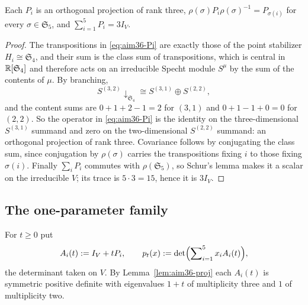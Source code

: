 \begin{lemma}\label{lem:aim36-proj}
Each $P_i$ is an orthogonal projection of rank three,
$\rho(\sigma)P_i\rho(\sigma)^{-1}=P_{\sigma(i)}$ for every
$\sigma\in\mathfrak S_5$, and $\sum_{i=1}^5P_i=3I_V$.
\end{lemma}
\begin{proof}
The transpositions in \eqref{eq:aim36-Pi} are exactly those of the point
stabilizer $H_i\cong\mathfrak S_4$, and their sum is the class sum of
transpositions, which is central in $\mathbb R[\mathfrak S_4]$ and therefore acts on an
irreducible Specht module $S^\mu$ by the sum of the contents of $\mu$.  By
branching,
\[
S^{(3,2)}\!\downarrow_{\mathfrak S_4}\cong S^{(3,1)}\oplus S^{(2,2)},
\]
and the content sums are $0+1+2-1=2$ for $(3,1)$ and $0+1-1+0=0$ for $(2,2)$.
So the operator in \eqref{eq:aim36-Pi} is the identity on the three-dimensional
$S^{(3,1)}$ summand and zero on the two-dimensional $S^{(2,2)}$ summand: an
orthogonal projection of rank three.  Covariance follows by conjugating the
class sum, since conjugation by $\rho(\sigma)$ carries the transpositions
fixing $i$ to those fixing $\sigma(i)$.  Finally $\sum_iP_i$ commutes with
$\rho(\mathfrak S_5)$, so Schur's lemma makes it a scalar on the irreducible
$V$; its trace is $5\cdot3=15$, hence it is $3I_V$.
\end{proof}

\subsection*{The one-parameter family}

For $t\ge0$ put
\[
A_i(t):=I_V+tP_i,\qquad
p_t(x):=\det\Bigl(\sum\nolimits_{i=1}^5x_iA_i(t)\Bigr),
\]
the determinant taken on $V$.  By Lemma~\ref{lem:aim36-proj} each $A_i(t)$ is
symmetric positive definite with eigenvalues $1+t$ of multiplicity three and
$1$ of multiplicity two.

